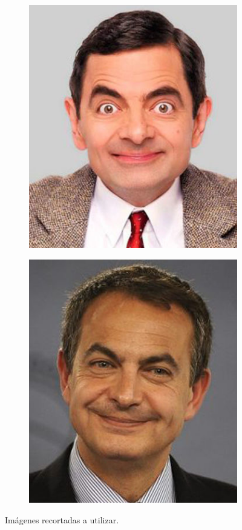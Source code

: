 \documentclass[11pt,a4paper]{article}
\begin{document}
\begin{figure}[H]
\begin{subfigure}{.5\linewidth}
\includegraphics[scale=0.38]{imagenes/mrbean2.png}
\label{fig:mrbean}
\end{subfigure}
\begin{subfigure}{.5\linewidth}
\includegraphics[scale=0.38]{imagenes/zapatero2.png}
\label{fig:zapatero}
\end{subfigure}
\caption{Imágenes recortadas a utilizar.}
\label{fig:resized}
\end{figure}
\end{document}
